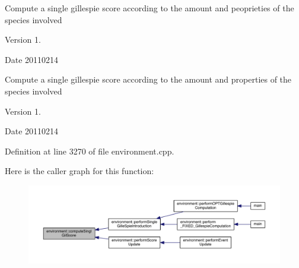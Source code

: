 Compute a single gillespie score according to the amount and peoprieties of the species involved \begin{DoxyVersion}{Version}
1. 
\end{DoxyVersion}
\begin{DoxyDate}{Date}
20110214
\end{DoxyDate}
Compute a single gillespie score according to the amount and properties of the species involved \begin{DoxyVersion}{Version}
1. 
\end{DoxyVersion}
\begin{DoxyDate}{Date}
20110214 
\end{DoxyDate}


Definition at line 3270 of file environment.\-cpp.



Here is the caller graph for this function\-:
\nopagebreak
\begin{figure}[H]
\begin{center}
\leavevmode
\includegraphics[width=350pt]{a00014_ae1270b9c235dd6b28413075197dba8e0_icgraph}
\end{center}
\end{figure}


